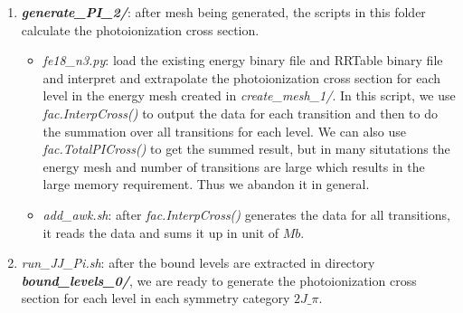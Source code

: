 \begin{enumerate}
	\item \textbf{\textit{generate\_PI\_2/}}: after mesh being generated, the scripts in this folder calculate the photoionization cross section.
		\begin{itemize}
			\item \textit{fe18\_n3.py}:  load the existing energy binary file and RRTable binary file and interpret and extrapolate the photoionization cross section for each level in the energy mesh created in \textit{create\_mesh\_1/}. In this script, we use \textit{fac.InterpCross()} to output the data for each transition and then to do the summation over all transitions for each level. We can also use \textit{fac.TotalPICross()} to get the summed result, but in many situtations the energy mesh and number of transitions are large which results in the large memory requirement. Thus we abandon it in general.
			\item \textit{add\_awk.sh}: after \textit{fac.InterpCross()} generates the data for all transitions, it reads the data and sums it up in unit of $Mb$.
		\end{itemize}
	
	\item \textit{run\_JJ\_Pi.sh}: after the bound levels are extracted in directory \textbf{\textit{bound\_levels\_0/}}, we are ready to generate the photoionization cross section for each level in each symmetry category $2J\_\pi$.
	

\end{enumerate}
